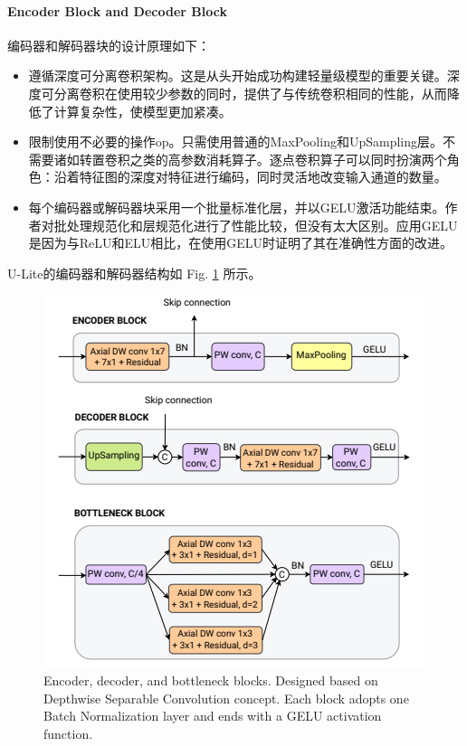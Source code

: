 \documentclass[a4paper, 10pt]{article}
\begin{document}
			\paragraph{Encoder Block and Decoder Block}
			
			编码器和解码器块的设计原理如下：
			
			\begin{itemize}
				\item [(1)] 遵循深度可分离卷积架构。这是从头开始成功构建轻量级模型的重要关键。深度可分离卷积在使用较少参数的同时，提供了与传统卷积相同的性能，从而降低了计算复杂性，使模型更加紧凑。
				\item [(2)] 限制使用不必要的操作op。只需使用普通的MaxPooling和UpSampling层。不需要诸如转置卷积之类的高参数消耗算子。逐点卷积算子可以同时扮演两个角色：沿着特征图的深度对特征进行编码，同时灵活地改变输入通道的数量。
				\item [(3)] 每个编码器或解码器块采用一个批量标准化层，并以GELU激活功能结束。作者对批处理规范化和层规范化进行了性能比较，但没有太大区别。应用GELU是因为与ReLU和ELU相比，在使用GELU时证明了其在准确性方面的改进。
			\end{itemize}
			
			U-Lite的编码器和解码器结构如 Fig. \ref{fig: Encoder and Decoder} 所示。
			
			\begin{figure}[htbp]
				\centering 
				\includegraphics[width=0.6\columnwidth]{picture/Lightweight Model/Encoder and Decoder}
				\caption{
					\label{fig: Encoder and Decoder} 
					Encoder, decoder, and bottleneck blocks. Designed based on Depthwise Separable Convolution concept. Each block adopts one Batch Normalization layer and ends with a GELU activation function.
				}
			\end{figure}
			
\end{document}
